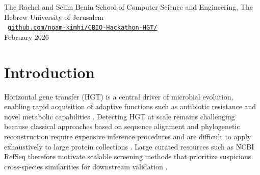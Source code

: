 \documentclass[11pt]{article}
\begin{document}
\begin{center}
\vspace{22pt}

The Rachel and Selim Benin School of Computer Science and Engineering, The Hebrew University of Jerusalem \\[6pt]
\faGithub\ \href{https://github.com/noam-kimhi/CBIO-Hackathon-HGT/}{\texttt{github.com/noam-kimhi/CBIO-Hackathon-HGT/}} \\[10pt]
February 2026
\end{center}

\vspace{5pt}


\begin{abstract}
Horizontal gene transfer (HGT) is a major driver of microbial evolution, yet detecting HGT at scale remains challenging due to the computational cost and complexity of alignment- and phylogeny-based methods. We present a scalable, alignment-free pipeline for identifying HGT candidates in large protein collections using sparse protein similarity graphs and graph-based anomaly analysis. Proteins are compared via k-mer overlap, normalized using robust statistics to account for species-specific background similarity, and embedded in a graph structure that enables detection of structurally anomalous cross-species similarity patterns. Applying the method to RefSeq bacterial proteins reveals distinct connectivity regimes, including dense
multi-taxa exchange modules, chained transfer-like structures, and localized high-confidence bridges. Our results demonstrate that graph-based structural context provides a powerful and interpretable signal for prioritizing HGT candidates suitable for downstream biological validation.
\end{abstract}

\setlength{\textfloatsep}{10pt}
\setlength{\floatsep}{8pt}
\setlength{\intextsep}{8pt}

\section{Introduction}

Horizontal gene transfer (HGT) is a central driver of microbial evolution, enabling rapid
acquisition of adaptive functions such as antibiotic resistance and novel metabolic capabilities \cite{Koonin2001,Davies2000}. Detecting HGT at scale remains challenging because classical approaches based on sequence alignment and phylogenetic reconstruction require expensive inference procedures and are difficult to apply exhaustively to large protein collections \cite{Ragan2001,Philippe2011}. Large curated resources such as NCBI RefSeq therefore motivate scalable screening methods that prioritize suspicious cross-species similarities for downstream validation \cite{OLeary2016}.
\end{document}
